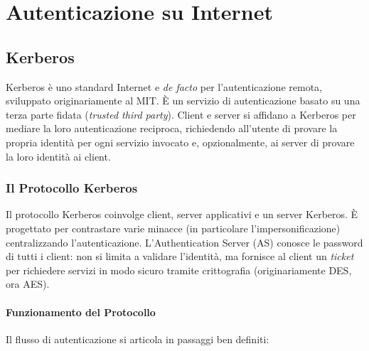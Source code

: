 \chapter{Autenticazione su Internet}

\section{Kerberos}

Kerberos è uno standard Internet e \textit{de facto} per l'autenticazione remota, sviluppato originariamente al MIT. È un servizio di autenticazione basato su una terza parte fidata (\textit{trusted third party}). Client e server si affidano a Kerberos per mediare la loro autenticazione reciproca, richiedendo all'utente di provare la propria identità per ogni servizio invocato e, opzionalmente, ai server di provare la loro identità ai client.

\subsection{Il Protocollo Kerberos}

Il protocollo Kerberos coinvolge client, server applicativi e un server Kerberos. È progettato per contrastare varie minacce (in particolare l'impersonificazione) centralizzando l'autenticazione. L'Authentication Server (AS) conosce le password di tutti i client: non si limita a validare l'identità, ma fornisce al client un \textit{ticket} per richiedere servizi in modo sicuro tramite crittografia (originariamente DES, ora AES).



\subsubsection{Funzionamento del Protocollo}
Il flusso di autenticazione si articola in passaggi ben definiti:

